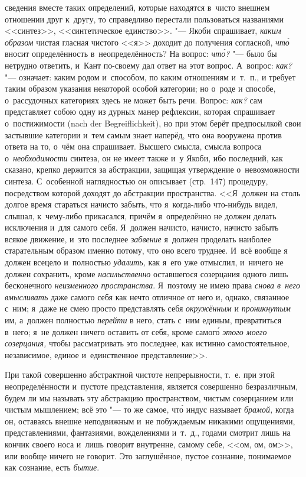 сведения вместе таких определений, которые находятся в~чисто внешнем отношении
друг к~другу, то справедливо перестали пользоваться названиями <<синтез>>,
<<синтетическое единство>>. "--- Якоби спрашивает, {\em каким образом}
чистая гласная чистого <<я>> доходит до получения согласной, {\em чт\'{о}}
вносит определённость в~неопределённость? На вопрос: {\em чт\'{о}?} "--- было бы
нетрудно ответить, и~Кант по-своему дал ответ на этот вопрос. А~вопрос:
{\em как?} "--- означает: каким родом и~способом, по каким отношениям и~т.~п.,
и требует таким образом указания некоторой особой категории; но о~роде и
способе, о~рассудочных категориях здесь не может быть речи. Вопрос: {\em как?}
сам представляет собою одну из дурных манер рефлексии, которая спрашивает
о~постижимости (nach der Begrei\-flich\-keit), но при этом берёт предпосылкой
свои застывшие категории и~тем самым знает наперёд, что она вооружена против
ответа на то, о~чём она спрашивает. Высшего смысла, смысла вопроса
о~{\em необходимости} синтеза, он не имеет также и~у Якоби, ибо последний, как
сказано, крепко держится за абстракции, защищая утверждение о~невозможности
синтеза. С~особенной наглядностью он описывает (стр.~147) процедуру,
посредством которой доходят до абстракции пространства. <<Я~должен на столь
долгое время стараться начисто забыть, что я~когда-либо что-нибудь видел,
слышал, к~чему-либо прикасался, причём я~определённо не должен делать
исключения и~для самого себя. Я~должен начисто, начисто, начисто забыть всякое
движение, и~это последнее {\em забвение} я~должен проделать наиболее
старательным образом именно потому, что оно всего труднее. И~всё вообще я
должен всецело и~полностью {\em удалить,} как я~его уже отмыслил, и~ничего не
должен сохранить, кроме {\em насильственно} оставшегося созерцания одного лишь
бесконечного {\em неизменного пространства}. Я~поэтому не имею права
{\em снова в~него вмысливать} даже самого себя как нечто отличное от него и,
однако, связанное с~ним; я~даже не смею просто представлять себя
{\em окружённым} и {\em проникнутым} им, а~должен полностью {\em перейти} в
него, стать с~ним единым, превратиться в~него; я~не должен ничего оставить от
себя, кроме самог\'{о} {\em этого моего созерцания,} чтобы рассматривать это
последнее, как истинно самостоятельное, независимое, единое и~единственное
представление>>.

При такой совершенно абстрактной чистоте непрерывности, т.~е. при этой
неопределённости и~пустоте представления, является совершенно безразличным,
будем ли мы называть эту абстракцию пространством, чистым созерцанием или
чистым мышлением; всё это "--- то же самое, чт\'{о} индус называет
{\em брамой,} когда он, оставаясь внешне неподвижным и~не побуждаемым
никакими ощущениями, представлениями, фантазиями, вожделениями и~т.~д.,
годами смотрит лишь на кончик своего носа и~лишь говорит внутренне, самому
себе, <<ом, ом, ом>>, или вообще ничего не говорит. Это заглушённое, пустое
сознание, понимаемое как сознание, есть {\em бытие}.

